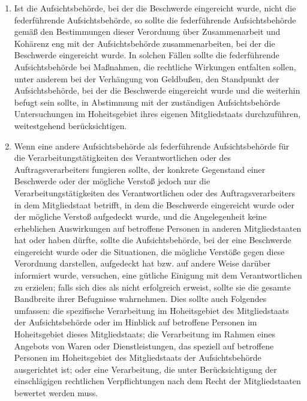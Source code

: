 \begin{enumerate}

   \item Ist die Aufsichtsbehörde, bei der die Beschwerde eingereicht wurde, nicht die federführende Aufsichtsbehörde,
    so sollte die federführende Aufsichtsbehörde gemäß den Bestimmungen dieser Verordnung über Zusammenarbeit und
    Kohärenz eng mit der Aufsichtsbehörde zusammenarbeiten, bei der die Beschwerde eingereicht wurde. In solchen Fällen
    sollte die federführende Aufsichtsbehörde bei Maßnahmen, die rechtliche Wirkungen entfalten sollen, unter anderem
    bei der Verhängung von Geldbußen, den Standpunkt der Aufsichtsbehörde, bei der die Beschwerde eingereicht wurde und
    die weiterhin befugt sein sollte, in Abstimmung mit der zuständigen Aufsichtsbehörde Untersuchungen im
    Hoheitsgebiet ihres eigenen Mitgliedstaats durchzuführen, weitestgehend berücksichtigen.%
   \label{itm:eg-130}
   

   \item Wenn eine andere Aufsichtsbehörde als federführende Aufsichtsbehörde für die Verarbeitungstätigkeiten des
    Verantwortlichen oder des Auftragsverarbeiters fungieren sollte, der konkrete Gegenstand einer Beschwerde oder der
    mögliche Verstoß jedoch nur die Verarbeitungstätigkeiten des Verantwortlichen oder des Auftragsverarbeiters in dem
    Mitgliedstaat betrifft, in dem die Beschwerde eingereicht wurde oder der mögliche Verstoß aufgedeckt wurde, und die
    Angelegenheit keine erheblichen Auswirkungen auf betroffene Personen in anderen Mitgliedstaaten hat oder haben
    dürfte, sollte die Aufsichtsbehörde, bei der eine Beschwerde eingereicht wurde oder die Situationen, die mögliche
    Verstöße gegen diese Verordnung darstellen, aufgedeckt hat bzw. auf andere Weise darüber informiert wurde,
    versuchen, eine gütliche Einigung mit dem Verantwortlichen zu erzielen; falls sich dies als nicht erfolgreich
    erweist, sollte sie die gesamte Bandbreite ihrer Befugnisse wahrnehmen. Dies sollte auch Folgendes umfassen: die
    spezifische Verarbeitung im Hoheitsgebiet des Mitgliedstaats der Aufsichtsbehörde oder im Hinblick auf betroffene
    Personen im Hoheitsgebiet dieses Mitgliedstaats; die Verarbeitung im Rahmen eines Angebots von Waren oder
    Dienstleistungen, das speziell auf betroffene Personen im Hoheitsgebiet des Mitgliedstaats der Aufsichtsbehörde
    ausgerichtet ist; oder eine Verarbeitung, die unter Berücksichtigung der einschlägigen rechtlichen Verpflichtungen
    nach dem Recht der Mitgliedstaaten bewertet werden muss.%
   \label{itm:eg-131}
   

\end{enumerate}
